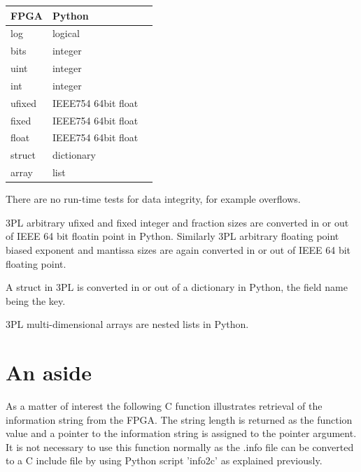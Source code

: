         \begin{tabular}{| l | l | l |}
        \hline
        FPGA    & Python                \\
        \hline
        log     & logical               \\
        bits    & integer               \\
        uint    & integer               \\
        int     & integer               \\
        ufixed  & IEEE754 64bit float   \\
        fixed   & IEEE754 64bit float   \\
        float   & IEEE754 64bit float   \\
        struct  & dictionary            \\
        array   & list                  \\
        \hline
        \end{tabular}
        
        There are no run-time tests for data integrity, for example overflows.
        
        3PL arbitrary ufixed and fixed integer and fraction sizes are converted
        in or out of IEEE 64 bit floatin point in Python. Similarly 3PL arbitrary
        floating point biased exponent and mantissa sizes are again converted
        in or out of IEEE 64 bit floating point.
        
        A struct in 3PL is converted in or out of a dictionary in Python, the
        field name being the key.
        
        3PL multi-dimensional arrays are nested lists in Python.

    \section{An aside}

        As a matter of interest the following C function illustrates retrieval of the information string
        from the FPGA. The string length is returned as the function value and
        a pointer to the information string is assigned to the pointer argument.
        It is not necessary to use this function normally as the .info file can be
        converted to a C include file by using Python script 'info2c' as explained
        previously.

